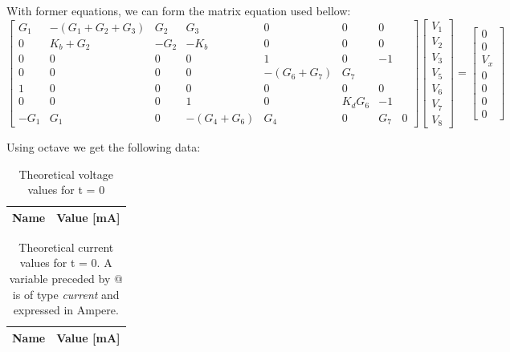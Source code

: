 With former equations, we can form the matrix equation used bellow:
\begin{equation*}
	\begin{bmatrix}
		G_1 & -(G_1 + G_2 + G_3) & G_2 & G_3 & 0 & 0 & 0 \\ 
		0 & K_b + G_2 & -G_2 & -K_b & 0 & 0 & 0 \\
		0 & 0 & 0 & 0 & 1 & 0 & -1 \\ 
		0 & 0 & 0 & 0 & -(G_6 + G_7) & G_7 \\
		1 & 0 & 0 & 0 & 0 & 0 & 0 \\
		0 & 0 & 0 & 1 & 0 & K_dG_6 & -1 \\
		-G_1 & G_1 & 0 & -(G_4 + G_6) & G_4 & 0 & G_7 & 0
	\end{bmatrix}
	\begin{bmatrix} V_1 \\ V_2 \\ V_3 \\ V_5 \\ V_6 \\ V_7 \\ V_8 
	\end{bmatrix}
	=
	\begin{bmatrix} 0 \\ 0 \\ V_x \\ 0 \\ 0 \\ 0 \\ 0 
	\end{bmatrix}
\end{equation*}

Using octave we get the following data:
\begin{table}[h!]
	\centering
	\begin{tabular}{|l|r|}
		\hline    
		{\bf Name} & {\bf Value [mA]} \\ \hline
		
	\end{tabular}
	\caption{Theoretical voltage values for t = 0}
	\label{tab:op}
\end{table}

\begin{table}[h!]
	\centering
	\begin{tabular}{|l|r|}
		\hline    
		{\bf Name} & {\bf Value [mA]} \\ \hline
		
	\end{tabular}
	\caption{Theoretical current values for t = 0. A variable preceded by @ is of type {\em current}
		and expressed in Ampere.}
	\label{tab:op}
\end{table}



